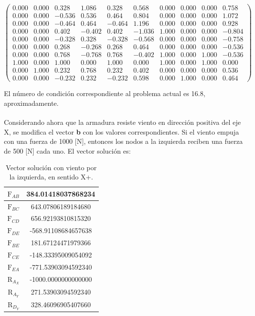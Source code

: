 \documentclass[12pt, notitlepage]{article}
\begin{document}
\begin{equation*}
\begin{pmatrix}
0.000 & 0.000 & 0.328 & 1.086 & 0.328 & 0.568 & 0.000 & 0.000 & 0.000 & 0.758 \\
0.000 & 0.000 & -0.536 & 0.536 & 0.464 & 0.804 & 0.000 & 0.000 & 0.000 & 1.072 \\
0.000 & 0.000 & -0.464 & 0.464 & -0.464 & 1.196 & 0.000 & 0.000 & 0.000 & 0.928 \\
0.000 & 0.000 & 0.402 & -0.402 & 0.402 & -1.036 & 1.000 & 0.000 & 0.000 & -0.804 \\
0.000 & 0.000 & -0.328 & 0.328 & -0.328 & -0.568 & 0.000 & 0.000 & 0.000 & -0.758\\
0.000 & 0.000 & 0.268 & -0.268 & 0.268 & 0.464 & 0.000 & 0.000 & 0.000 & -0.536 \\
0.000 & 0.000 & 0.768 & -0.768 & 0.768 & -0.402 & 1.000 & 0.000 & 1.000 & -0.536 \\
1.000 & 0.000 & 1.000 & 0.000 & 1.000 & 0.000 & 1.000 & 0.000 & 1.000 & 0.000     \\
0.000 & 1.000 & 0.232 & 0.768 & 0.232 & 0.402 & 0.000 & 0.000 & 0.000 & 0.536 \\
0.000 & 0.000 & -0.232 & 0.232 & -0.232 & 0.598 & 0.000 & 1.000 & 0.000 & 0.464
\end{pmatrix}
\end{equation*}

El número de condición correspondiente al problema actual es 16.8, aproximadamente.\\\\

Considerando ahora que la armadura resiste viento en dirección positiva del eje X, se modifica el vector \textbf{b} con los valores correspondientes. Si el viento empuja con una fuerza de 1000 [N], entonces los nodos a la izquierda reciben una fuerza de 500 [N] cada uno. El vector solución es:

\begin{table}[H]
\centering
\caption{Vector solución con viento por la izquierda, en sentido X+.}
\begin{tabular}{|c|c|} \hline
$\text{F}_{AB}$ & 384.01418037868234 \\ \hline $\text{F}_{BC}$ & 643.07806189184680 \\ \hline $\text{F}_{CD}$ & 656.92193810815320 \\ \hline $\text{F}_{DE}$ & -568.91108684657638 \\ \hline $\text{F}_{BE}$ & 181.67124471979366 \\ \hline $\text{F}_{CE}$ & -148.33395009054092 \\ \hline $\text{F}_{EA}$ & -771.53903094592340  \\ \hline $\text{R}_{A_X}$ & -1000.0000000000000   \\ \hline $\text{R}_{A_Y}$ &  271.53903094592340 \\ \hline $\text{R}_{D_Y}$ & 328.46096905407660 \\ \hline
\end{tabular}
\end{table}
\end{document}

